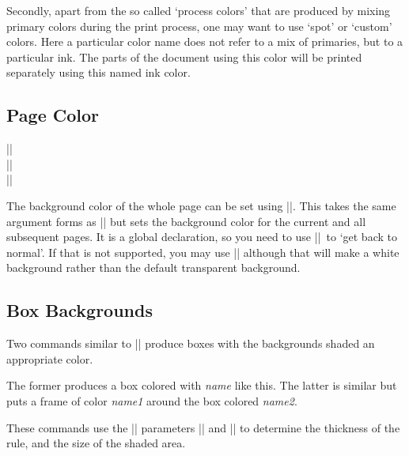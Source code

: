 Secondly, apart from the so called `process colors' that are produced
by mixing primary colors during the print process, one may want to use
`spot' or `custom' colors. Here a particular color name does not
refer to a mix of primaries, but to a particular ink. The parts of the
document using this color will be printed separately using this named
ink color.

\subsection{Page Color}


\begin{decl}
|\pagecolor|\\
|\pagecolor|\\
|\nopagecolor|
\end{decl}

The background color of the whole page can be set using
|\pagecolor|. This takes the same argument forms as |\color| but sets
the background color for the current and all subsequent pages. It is
a global declaration, so you need to  use
|\nopagecolor|\ to `get back to normal'.
If that is not supported, you may use |\pagecolor{white}| although that
will make a white background rather than the default transparent background.

\subsection{Box Backgrounds}
Two commands similar to |\fbox| produce boxes with the backgrounds
shaded an appropriate color.



The former produces a box colored with \emph{name}
\colorbox{mygrey}{like this}. The latter is similar but puts a frame of
color \emph{name1} around the box colored \emph{name2}.

These commands use the |\fbox| parameters |\fboxrule| and |\fboxsep|
to determine the thickness of the rule, and the size of the shaded area.

